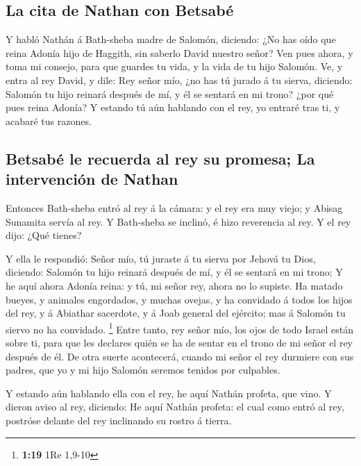 \hypertarget{la-cita-de-nathan-con-betsabuxe9}{%
\subsection{La cita de Nathan con
Betsabé}\label{la-cita-de-nathan-con-betsabuxe9}}

 Y habló Nathán á Bath-sheba madre de Salomón, diciendo:
¿No has oído que reina Adonía hijo de Haggith, sin saberlo David nuestro
señor?  Ven pues ahora, y toma mi consejo, para que guardes
tu vida, y la vida de tu hijo Salomón.  Ve, y entra al rey
David, y dile: Rey señor mío, ¿no has tú jurado á tu sierva, diciendo:
Salomón tu hijo reinará después de mí, y él se sentará en mi trono? ¿por
qué pues reina Adonía?  Y estando tú aún hablando con el
rey, yo entraré tras ti, y acabaré tus razones.

\hypertarget{betsabuxe9-le-recuerda-al-rey-su-promesa-la-intervenciuxf3n-de-nathan}{%
\subsection{Betsabé le recuerda al rey su promesa; La intervención de
Nathan}\label{betsabuxe9-le-recuerda-al-rey-su-promesa-la-intervenciuxf3n-de-nathan}}

 Entonces Bath-sheba entró al rey á la cámara: y el rey era
muy viejo; y Abisag Sunamita servía al rey.  Y Bath-sheba
se inclinó, é hizo reverencia al rey. Y el rey dijo: ¿Qué tienes?

 Y ella le respondió: Señor mío, tú juraste á tu sierva por
Jehová tu Dios, diciendo: Salomón tu hijo reinará después de mí, y él se
sentará en mi trono;  Y he aquí ahora Adonía reina: y tú,
mi señor rey, ahora no lo supiste.  Ha matado bueyes, y
animales engordados, y muchas ovejas, y ha convidado á todos los hijos
del rey, y á Abiathar sacerdote, y á Joab general del ejército; mas á
Salomón tu siervo no ha convidado. \footnote{\textbf{1:19} 1Re 1,9-10}
 Entre tanto, rey señor mío, los ojos de todo Israel están
sobre ti, para que les declares quién se ha de sentar en el trono de mi
señor el rey después de él.  De otra suerte acontecerá,
cuando mi señor el rey durmiere con sus padres, que yo y mi hijo Salomón
seremos tenidos por culpables.

 Y estando aún hablando ella con el rey, he aquí Nathán
profeta, que vino.  Y dieron aviso al rey, diciendo: He
aquí Nathán profeta: el cual como entró al rey, postróse delante del rey
inclinando su rostro á tierra.


